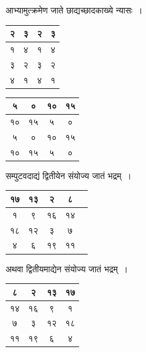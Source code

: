 \documentclass[11pt, openany]{book}
\begin{document}
\begin{center}
आभ्यामुत्क्रमेण जाते छाद्यच्छादकाख्ये न्यासः~।

\begin{table}[h]
	\centering
\begin{tabular}{|c|c|c|c|}
	\hline
२ & ३ & २ & ३\\
\hline
१ & ४ & १ & ४\\
\hline
३ & २ & ३ & २\\
\hline
४ & १ & ४ & १\\
\hline
\end{tabular}\qquad
\begin{tabular}{|c|c|c|c|}
\hline
५ & ० & १० & १५\\
\hline
१० & १५ & ५ & ०\\
\hline
५ & ० & १० & १५\\
\hline
१० & १५ & ५ & ० \\
\hline
\end{tabular}
\end{table}

सम्पुटवदाद्यं द्वितीयेन संयोज्य जातं भद्रम्~।	

\begin{table}[h]
	\centering
		\begin{tabular}{|c|c|c|c|c|}
	\hline
१७ & १३ & २ & ८\\
\hline
१ & ९ & १६ & १४\\
\hline
१८ & १२ & ३ & ७\\
\hline
४ & ६ & १९ & ११\\
\hline
\end{tabular}
\end{table}
\end{center}

\newpage

\begin{center}
 अथवा द्वितीयमाद्येन संयोज्य जातं भद्रम्~।	
\end{center}
\vspace{-0.4cm}
\begin{table}[h]
	\setlength{\extrarowheight}{2pt} \setlength{\tabcolsep}{2pt}
	\centering
\begin{tabular}{|c|c|c|c|}
	\hline
८ & २ & १३ & १७\\
\hline
१४ & १६ & ९ & १\\
\hline
७ & ३ & १२ & १८\\
\hline
११ & १९ & ६ & ४\\
\hline
\end{tabular}
\end{table}
\end{document}
